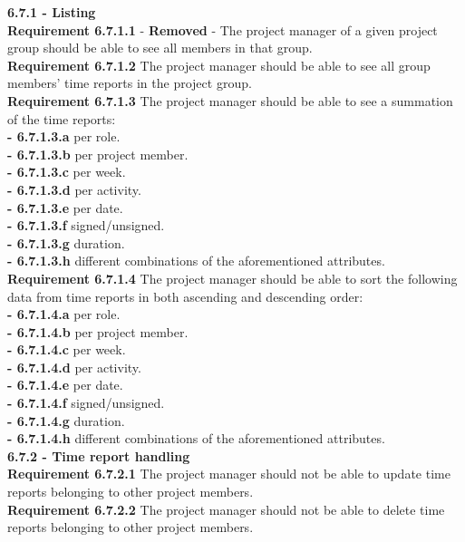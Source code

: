 \documentclass{article}
\begin{document}
{\fontsize{11}{11}\selectfont \noindent\textbf{6.7.1 - Listing}} \\
\noindent\textbf{Requirement 6.7.1.1} - \textbf{Removed} - The project manager of a given project group should be able to see all members in that group. \\
\textbf{Requirement 6.7.1.2} The project manager should be able to see all group members' time reports in the project group.\\
\textbf{Requirement 6.7.1.3} The project manager should be able to see a summation of the time reports:  \\
\indent
\textbf{- 6.7.1.3.a} per role.\\
\indent
\textbf{- 6.7.1.3.b} per project member.\\
\indent
\textbf{- 6.7.1.3.c} per week.\\
\indent
\textbf{- 6.7.1.3.d} per activity.\\
\indent
\textbf{- 6.7.1.3.e} per date.\\
\indent
\textbf{- 6.7.1.3.f} signed/unsigned.\\
\indent
\textbf{- 6.7.1.3.g} duration.\\
\indent
\textbf{- 6.7.1.3.h} different combinations of the aforementioned attributes.\\
\textbf{Requirement 6.7.1.4} The project manager should be able to sort the following data from time reports in both ascending and descending order:  \\
\indent
\textbf{- 6.7.1.4.a} per role.\\
\indent
\textbf{- 6.7.1.4.b} per project member.\\
\indent
\textbf{- 6.7.1.4.c} per week.\\
\indent
\textbf{- 6.7.1.4.d} per activity.\\
\indent
\textbf{- 6.7.1.4.e} per date.\\
\indent
\textbf{- 6.7.1.4.f} signed/unsigned.\\
\indent
\textbf{- 6.7.1.4.g} duration.\\
\indent
\textbf{- 6.7.1.4.h} different combinations of the aforementioned attributes.\\

{\fontsize{11}{11}\selectfont \noindent\textbf{6.7.2 - Time report handling}} \\
\textbf{Requirement 6.7.2.1} The project manager should not be able to update time reports belonging to other project members.\\
\textbf{Requirement 6.7.2.2} The project manager should not be able to delete time reports belonging to other project members.\\
\end{document}
